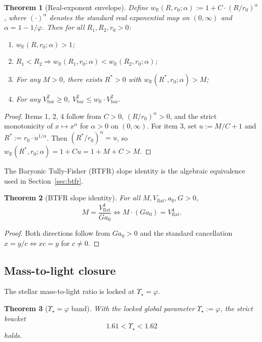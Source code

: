 \documentclass[11pt,a4paper]{article}
\newcommand{\Ystar}{\ensuremath{\Upsilon_{\star}}}
\theoremstyle{plain}
\newtheorem{theorem}{Theorem}
\theoremstyle{definition}
\begin{document}
\begin{theorem}[Real-exponent envelope]
\label{thm:rpow}
Define $w_{\mathbb{R}}(R, r_0; \alpha) := 1 + C \cdot (R/r_0)^{\alpha}$, where $(\cdot)^{\alpha}$ denotes the standard real exponential map on $(0,\infty)$ and $\alpha = 1 - 1/\varphi$. Then for all $R_1, R_2, r_0 > 0$:
\begin{enumerate}\itemsep0pt
\item $w_{\mathbb{R}}(R, r_0; \alpha) > 1$;
\item $R_1 < R_2 \Rightarrow w_{\mathbb{R}}(R_1, r_0; \alpha) < w_{\mathbb{R}}(R_2, r_0; \alpha)$;
\item For any $M > 0$, there exists $R^* > 0$ with $w_{\mathbb{R}}(R^*, r_0; \alpha) > M$;
\item For any $V_{\mathrm{bar}}^{2} \geq 0$, $V_{\mathrm{bar}}^{2} \leq w_{\mathbb{R}} \cdot V_{\mathrm{bar}}^{2}$.
\end{enumerate}
\end{theorem}

\begin{proof}
Items 1, 2, 4 follow from $C > 0$, $(R/r_0)^\alpha > 0$, and the strict monotonicity of $x \mapsto x^\alpha$ for $\alpha > 0$ on $(0,\infty)$. For item 3, set $u := M/C + 1$ and $R^* := r_0 \cdot u^{1/\alpha}$. Then $(R^*/r_0)^\alpha = u$, so $w_{\mathbb{R}}(R^*, r_0; \alpha) = 1 + C u = 1 + M + C > M$.
\end{proof}

The Baryonic Tully-Fisher (BTFR) slope identity is the algebraic equivalence used in Section~\ref{sec:btfr}.

\begin{theorem}[BTFR slope identity]
\label{thm:btfrid}
For all $M, V_{\mathrm{flat}}, a_0, G > 0$,
\[
M = \frac{V_{\mathrm{flat}}^{4}}{G a_0} \iff M \cdot (G a_0) = V_{\mathrm{flat}}^{4}.
\]
\end{theorem}

\begin{proof}
Both directions follow from $G a_0 > 0$ and the standard cancellation $x = y/c \Leftrightarrow x c = y$ for $c \neq 0$.
\end{proof}

\subsection{Mass-to-light closure}
\label{sec:mtl}
The stellar mass-to-light ratio is locked at $\Ystar = \varphi$.

\begin{theorem}[$\Ystar = \varphi$ band]
\label{thm:upsilon}
With the locked global parameter $\Ystar := \varphi$, the strict bracket
\[
1.61 < \Ystar < 1.62
\]
holds.
\end{theorem}
\end{document}
